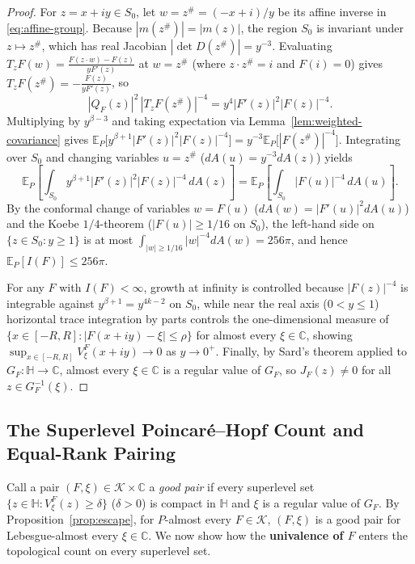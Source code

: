 \documentclass[12pt]{article}
\def\C{\mathbb{C}}
\def\H{\mathbb{H}}
\def\K{\mathcal{K}}
\def\E{\mathbb{E}}
\theoremstyle{definition}
\numberwithin{equation}{section}
\begin{document}
\begin{proof}
For $z = x+iy \in S_0$, let $w = z^\# = (-x+i)/y$ be its affine inverse in \eqref{eq:affine-group}. Because $|m(z^\#)| = |m(z)|$, the region $S_0$ is invariant under $z \mapsto z^\#$, which has real Jacobian $|\det D(z^\#)| = y^{-3}$. Evaluating $T_z F(w) = \frac{F(z\cdot w)-F(z)}{yF'(z)}$ at $w = z^\#$ (where $z \cdot z^\# = i$ and $F(i) = 0$) gives $T_z F(z^\#) = -\frac{F(z)}{y F'(z)}$, so
\[
  |Q_F(z)|^2 \, |T_z F(z^\#)|^{-4} = y^4 |F'(z)|^2 |F(z)|^{-4}.
\]
Multiplying by $y^{\beta - 3}$ and taking expectation via Lemma~\ref{lem:weighted-covariance} gives $\E_P\big[y^{\beta+1}|F'(z)|^2 |F(z)|^{-4}\big] = y^{-3}\E_P\big[|F(z^\#)|^{-4}\big]$. Integrating over $S_0$ and changing variables $u = z^\#$ ($dA(u) = y^{-3} dA(z)$) yields
\[
  \E_P\left[\int_{S_0} y^{\beta+1} |F'(z)|^2 |F(z)|^{-4} \, dA(z)\right] = \E_P\left[\int_{S_0} |F(u)|^{-4} \, dA(u)\right].
\]
By the conformal change of variables $w = F(u)$ ($dA(w) = |F'(u)|^2 dA(u)$) and the Koebe $1/4$-theorem ($|F(u)| \ge 1/16$ on $S_0$), the left-hand side on $\{z \in S_0 : y \ge 1\}$ is at most $\int_{|w|\ge 1/16} |w|^{-4} dA(w) = 256\pi$, and hence $\E_P[I(F)] \le 256\pi$.

For any $F$ with $I(F) < \infty$, growth at infinity is controlled because $|F(z)|^{-4}$ is integrable against $y^{\beta+1} = y^{4k-2}$ on $S_0$, while near the real axis ($0 < y \le 1$) horizontal trace integration by parts controls the one-dimensional measure of $\{x \in [-R, R] : |F(x+iy) - \xi| \le \rho\}$ for almost every $\xi \in \C$, showing $\sup_{x \in [-R, R]} V_\xi^F(x+iy) \to 0$ as $y \to 0^+$. Finally, by Sard's theorem applied to $G_F : \H \to \C$, almost every $\xi \in \C$ is a regular value of $G_F$, so $J_F(z) \ne 0$ for all $z \in G_F^{-1}(\xi)$.
\end{proof}

\subsection{The Superlevel Poincar\'e--Hopf Count and Equal-Rank Pairing}

Call a pair $(F, \xi) \in \K \times \C$ a \emph{good pair} if every superlevel set $\{z \in \H : V_\xi^F(z) \ge \delta\}$ ($\delta > 0$) is compact in $\H$ and $\xi$ is a regular value of $G_F$. By Proposition~\ref{prop:escape}, for $P$-almost every $F \in \K$, $(F, \xi)$ is a good pair for Lebesgue-almost every $\xi \in \C$. We now show how the \textbf{univalence of $F$} enters the topological count on every superlevel set.
\end{document}
